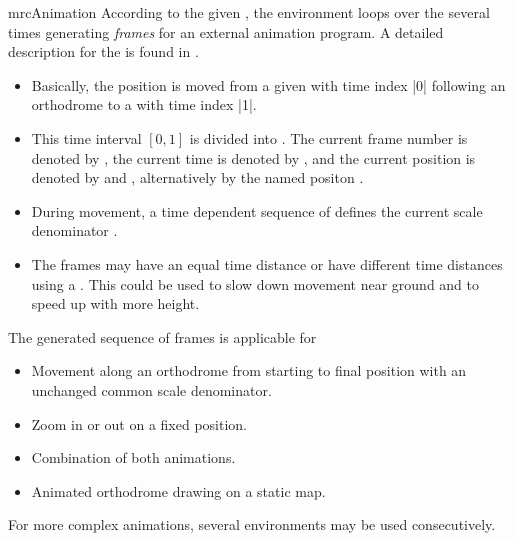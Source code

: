 \begin{docEnvironment}[doc new=2024-07-31]{mrcAnimation}{}
  According to the given , the environment loops over the
   several times generating \textit{frames}
  for an external animation program.
  A detailed description for the  is found in .
  \begin{itemize}
  \item Basically, the position is moved from
    a given  with time index |0|
    following an orthodrome
    to a  with time index |1|.
  \item
    This time interval $[0,1]$ is divided into .
    The current frame number is denoted by ,
    the current time is denoted by  , and
    the current position is denoted by
     and ,
    alternatively by the named positon .
  \item
    During movement, a time dependent sequence of 
    defines the current scale denominator .
  \item
    The frames may have an equal time distance or have different time
    distances using a . This could be used
    to slow down movement near ground and to speed up with more height.
  \end{itemize}
  The generated sequence of frames is applicable for
  \begin{itemize}
  \item Movement along an orthodrome from starting to final position with an unchanged
    common scale denominator.
  \item Zoom in or out on a fixed position.
  \item Combination of both animations.
  \item Animated orthodrome drawing on a static map.
  \end{itemize}
  For more complex animations, several  environments may be
  used consecutively.
\end{docEnvironment}

